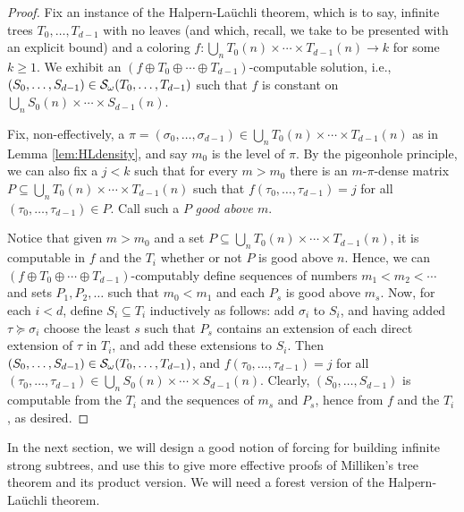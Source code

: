 \begin{proof}
	Fix an instance of the Halpern-La\"{u}chli theorem, which is to say, infinite trees $T_0,\ldots,T_{d-1}$ with no leaves (and which, recall, we take to be presented with an explicit bound) and a coloring $f: \bigcup_n T_0(n) \times \cdots \times T_{d-1}(n) \to k$ for some $k \geq 1$. We exhibit an $(f \oplus T_0 \oplus \cdots \oplus T_{d-1})$-computable solution, i.e., $(S_0,\ldots,S_{d-1}) \in \mathcal{S}_{\omega}({T_0,\ldots,T_{d-1}})$ such that $f$ is constant on $\bigcup_n S_0(n) \times \cdots \times S_{d-1}(n)$.

	Fix, non-effectively, a $\pi = (\sigma_0,\ldots,\sigma_{d-1}) \in \bigcup_n T_0(n) \times \cdots \times T_{d-1}(n)$ as in Lemma \ref{lem:HLdensity}, and say $m_0$ is the level of $\pi$. By the pigeonhole principle, we can also fix a $j < k$ such that for every $m > m_0$ there is an $m$-$\pi$-dense matrix $P \subseteq \bigcup_{n} T_0(n) \times \cdots \times T_{d-1}(n)$ such that $f(\tau_0,\ldots,\tau_{d-1}) = j$ for all $(\tau_0,\ldots,\tau_{d-1}) \in P$. Call such a $P$ \emph{good above $m$}.

	Notice that given $m  > m_0$ and a set $P \subseteq \bigcup_{n} T_0(n) \times \cdots \times T_{d-1}(n)$, it is computable in $f$ and the $T_i$ whether or not $P$ is good above $n$. Hence, we can $(f \oplus T_0 \oplus \cdots \oplus T_{d-1})$-computably define sequences of numbers $m_1 < m_2 < \cdots$ and sets $P_1,P_2,\ldots$ such that $m_0 < m_1$ and each $P_s$ is good above $m_s$. Now, for each $i < d$, define $S_i \subseteq T_i$ inductively as follows: add $\sigma_i$ to $S_i$, and having added $\tau \succeq \sigma_i$ choose the least $s$ such that $P_s$ contains an extension of each direct extension of $\tau$ in $T_i$, and add these extensions to $S_i$. Then $(S_0,\ldots,S_{d-1}) \in \mathcal{S}_{\omega}({T_0,\ldots,T_{d-1}})$, and $f(\tau_0,\ldots,\tau_{d-1}) = j$ for all $(\tau_0,\ldots,\tau_{d-1}) \in \bigcup_n S_0(n) \times \cdots \times S_{d-1}(n)$. Clearly, $(S_0,\ldots,S_{d-1})$ is computable from the $T_i$ and the sequences of $m_s$ and $P_s$, hence from $f$ and the $T_i$, as desired.
\end{proof}

In the next section, we will design a good notion of forcing for building infinite strong subtrees, and use this to give more effective proofs of Milliken's tree theorem and its product version. We will need a forest version of the Halpern-La\"{u}chli theorem.

